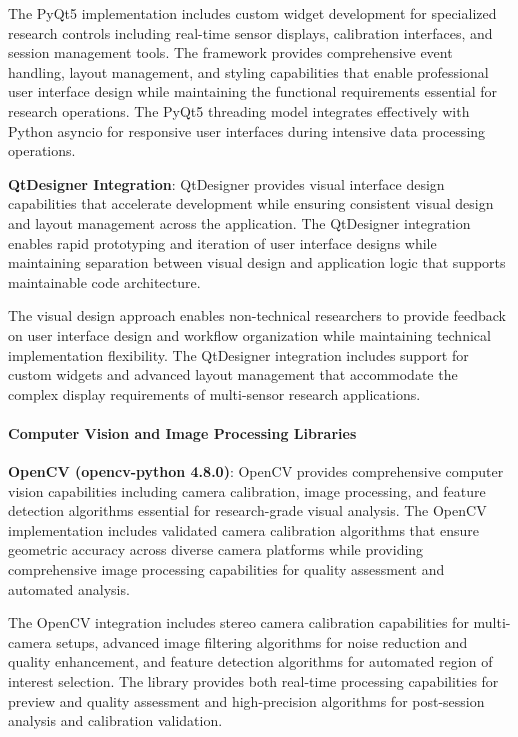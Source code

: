 \documentclass[12pt,a4paper]{article}
\begin{document}
The PyQt5 implementation includes custom widget development for specialized research controls including real-time sensor
displays, calibration interfaces, and session management tools. The framework provides comprehensive event handling,
layout management, and styling capabilities that enable professional user interface design while maintaining the
functional requirements essential for research operations. The PyQt5 threading model integrates effectively with Python
asyncio for responsive user interfaces during intensive data processing operations.

\textbf{QtDesigner Integration}: QtDesigner provides visual interface design capabilities that accelerate development while
ensuring consistent visual design and layout management across the application. The QtDesigner integration enables rapid
prototyping and iteration of user interface designs while maintaining separation between visual design and application
logic that supports maintainable code architecture.

The visual design approach enables non-technical researchers to provide feedback on user interface design and workflow
organization while maintaining technical implementation flexibility. The QtDesigner integration includes support for
custom widgets and advanced layout management that accommodate the complex display requirements of multi-sensor research
applications.

\paragraph{Computer Vision and Image Processing Libraries}

\textbf{OpenCV (opencv-python 4.8.0)}: OpenCV provides comprehensive computer vision capabilities including camera
calibration, image processing, and feature detection algorithms essential for research-grade visual analysis. The OpenCV
implementation includes validated camera calibration algorithms that ensure geometric accuracy across diverse camera
platforms while providing comprehensive image processing capabilities for quality assessment and automated analysis.

The OpenCV integration includes stereo camera calibration capabilities for multi-camera setups, advanced image filtering
algorithms for noise reduction and quality enhancement, and feature detection algorithms for automated region of
interest selection. The library provides both real-time processing capabilities for preview and quality assessment and
high-precision algorithms for post-session analysis and calibration validation.
\end{document}
